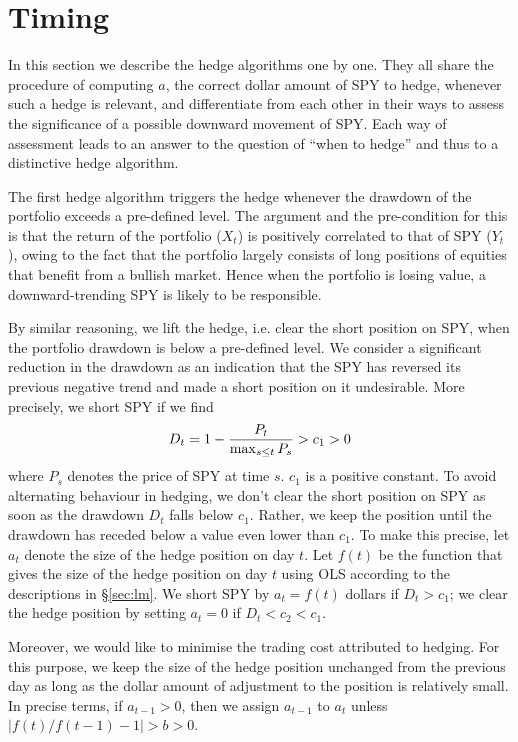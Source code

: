 \documentclass{article}
\begin{document}
\section{Timing}\label{sec:when}
In this section we describe the hedge algorithms one by one. They all
share the procedure of computing $a$, the correct dollar amount of SPY
to hedge, whenever such a hedge is relevant, and differentiate from
each other in their ways to assess the significance of a possible
downward movement of SPY. Each way of assessment leads to an answer to
the question of ``when to hedge'' and thus to a distinctive hedge
algorithm.

The first hedge algorithm triggers the hedge whenever the
drawdown of the portfolio exceeds a pre-defined level. The argument
and the pre-condition for this is that the return of the portfolio
($X_t$) is positively correlated to that of SPY ($Y_t$), owing to
the fact that the portfolio largely consists of long positions of
equities that benefit from a bullish market. Hence when the
portfolio is losing value, a downward-trending SPY is likely to be
responsible.

By similar reasoning, we lift the hedge, i.e. clear the short position
on SPY, when the portfolio drawdown is below a pre-defined level. We
consider a significant reduction in the drawdown as an indication that
the SPY has reversed its previous negative trend and made a short
position on it undesirable. More precisely, we short SPY if we find
\[
  D_t = 1 - {P_t \over \max_{s \leq t} P_s} > c_1 > 0
\]
where $P_s$ denotes the price of SPY at time $s$. $c_1$ is a positive
constant. To avoid alternating behaviour in hedging, we don't clear
the short position on SPY as soon as the drawdown $D_t$ falls below
$c_1$. Rather, we keep the position until the drawdown has receded
below a value even lower than $c_1$. To make this precise, let $a_t$
denote the size of the hedge position on day $t$. Let $f(t)$ be the
function that gives the size of the hedge position on day $t$ using
OLS according to the descriptions in \S \ref{sec:lm}. We short SPY by
$a_t = f(t)$ dollars if $D_t > c_1$; we clear the
hedge position by setting $a_t = 0$ if $D_t < c_2 < c_1$.


Moreover, we would like to minimise the trading cost attributed to
hedging. For this purpose, we keep the size of the hedge position
unchanged from the previous day as long as the dollar amount of
adjustment to the position is relatively small. In precise terms, if
$a_{t-1} > 0$, then we assign $a_{t-1}$ to $a_t$ unless
$|f(t)/f(t-1) - 1| > b > 0$.
\end{document}
